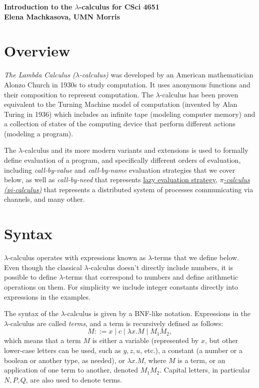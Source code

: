 \documentclass{article}
\newcommand{\lam}{\lambda}
\begin{document}



\begin{center}
{\large\bf Introduction to the $\lam$-calculus for CSci 4651}
\\ 
{\large\bf Elena Machkasova, UMN Morris}
\end{center}

\section{Overview}
\textit{The Lambda Calculus ($\lam$-calculus)} was developed by an American mathematician Alonzo Church in 1930s to study computation. 
It uses anonymous functions and their composition to represent computation. The $\lam$-calculus has been proven equivalent to 
the Turning Machine model of computation (invented by Alan Turing in 1936) which includes an infinite tape (modeling computer memory) and a collection of states of the computing device that perform different actions (modeling a program). 

The $\lam$-calculus and its more modern variants and extensions is used to formally define evaluation of a program, and 
specifically different orders of evaluation, including \textit{call-by-value} and \textit{call-by-name} evaluation strategies that we cover below, 
as well as \textit{call-by-need} that represents \href{https://en.wikipedia.org/wiki/Lazy_evaluation}{lazy evaluation strategy}, 
\href{https://en.wikipedia.org/wiki/\%CE\%A0-calculus}{\textit{$\pi$-calculus (pi-calculus)}} that represents a distributed system of processes communicating via channels, and many other. 

\section{Syntax}

$\lam$-calculus operates with expressions known as $\lam$-terms that we define below. 
Even though the classical $\lam$-calculus doesn't directly include numbers, it is possible to define $\lam$-terms 
that correspond to numbers and define
arithmetic operations on them. For simplicity we include integer constants directly into expressions in the examples. 

The syntax of the $\lam$-calculus is given by a BNF-like notation. Expressions in the $\lam$-calculus are called \textit{terms}, 
and a term is recursively defined as follows:
$$
M ::= x \mid c \mid \lam x. M \mid M_1 M_2,
$$
which means that a term $M$ is either a variable (represented by $x$, but other lower-case letters can be used, such as $y,z,u$, etc.), a constant (a number or a boolean or another type, as needed), or $\lam x. M$, where $M$ is a term, or an application of one term to another, denoted $M_1 M_2$. Capital letters, in particular $N, P, Q$, are also used to denote terms. 
\end{document}
